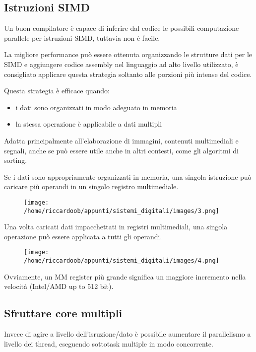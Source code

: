 \subsection{Istruzioni SIMD}
Un buon compilatore è capace di inferire dal codice le possibili computazione parallele per istruzioni SIMD, tuttavia non è facile.

La migliore performance può essere ottenuta organizzando le strutture dati per le SIMD e aggiungere codice assembly nel linguaggio ad alto livello utilizzato, è consigliato applicare questa strategia soltanto alle porzioni più intense del codice.

Questa strategia è efficace quando:
\begin{itemize}
    \item i dati sono organizzati in modo adeguato in memoria
    \item la stessa operazione è applicabile a dati multipli
\end{itemize}

Adatta principalmente all'elaborazione di immagini, contenuti multimediali e segnali, anche se può essere utile anche in altri contesti, come gli algoritmi di sorting.

Se i dati sono appropriamente organizzati in memoria, una singola istruzione può caricare più operandi in un singolo registro multimediale.

\begin{figure}[H]
    \centering
    \texttt{[image: /home/riccardoob/appunti/sistemi\_digitali/images/3.png]}
\end{figure}

Una volta caricati dati impacchettati in registri multimediali, una singola operazione può essere applicata a tutti gli operandi.

\begin{figure}[H]
    \centering
    \texttt{[image: /home/riccardoob/appunti/sistemi\_digitali/images/4.png]}
\end{figure}

Ovviamente, un MM register più grande significa un maggiore incremento nella velocità (Intel/AMD up to 512 bit).

\subsection{Sfruttare core multipli}
Invece di agire a livello dell'isruzione/dato è possibile aumentare il parallelismo a livello dei thread, eseguendo sottotask multiple in modo concorrente.

